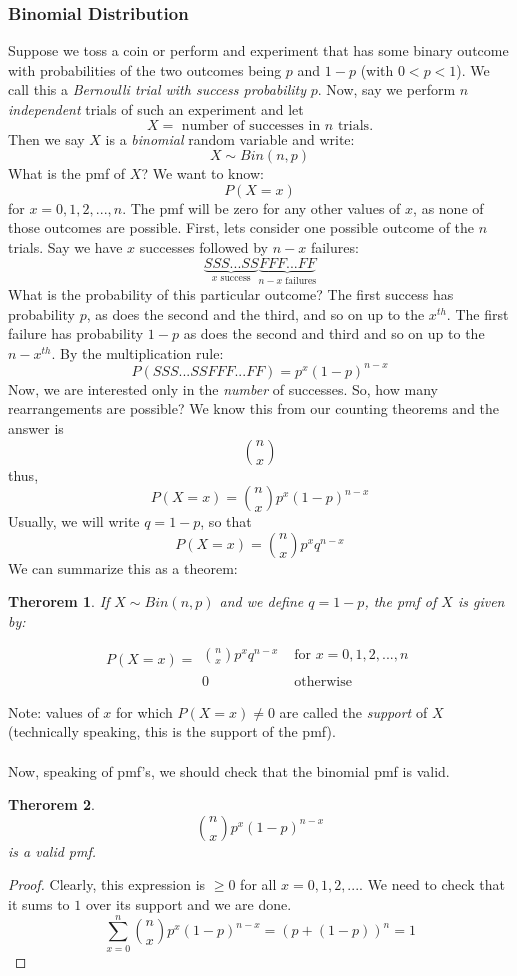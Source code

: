 \documentclass[12pt]{article} %
\newtheorem{thm}{Therorem}
\begin{document}
\subsubsection{Binomial Distribution}
Suppose we toss a coin or perform and experiment that has some binary outcome with probabilities of the two outcomes being $p$ and $1-p$ (with $0<p<1$). We call this a \emph{Bernoulli trial with success probability} $p$. Now, say we perform $n$ \emph{independent} trials of such an experiment and let 
$$X = \textrm{ number of successes in } n \textrm{ trials.}$$
Then we say $X$ is a \emph{binomial} random variable and write:
$$X\sim Bin(n,p)$$
What is the pmf of $X$? We want to know:
$$P(X = x)$$
for $x=0,1,2,...,n$. The pmf will be zero for any other values of $x$, as none of those outcomes are possible. First, lets consider one possible outcome of the $n$ trials. Say we have $x$ successes followed by $n-x$ failures:
$$\underbrace{SSS...SS}_{x\textrm{ success}}\underbrace{FFF...FF}_{n-x\textrm{ failures}}$$
What is the probability of this particular outcome? The first success has probability $p$, as does the second and the third, and so on up to the $x^{th}$. The first failure has probability $1-p$ as does the second and third and so on up to the $n-x^{th}$. By the multiplication rule:
$$P(SSS...SSFFF...FF) = p^x(1-p)^{n-x}$$
Now, we are interested only in the \emph{number} of successes. So, how many rearrangements are possible? We know this from our counting theorems and the answer is 
$$n\choose{x}$$
thus, 
$$P(X = x) = {n\choose{x}} p^x(1-p)^{n-x}$$
Usually, we will write $q=1-p$, so that 
$$P(X = x) = {n\choose{x}} p^xq^{n-x}$$
We can summarize this as a theorem:
\begin{thm}
If $X\sim Bin(n,p)$ and we define $q=1-p$, the pmf of $X$ is given by:
$$P(X = x) = \begin{matrix}&\\&\\{n\choose{x}} p^xq^{n-x}&\textrm{ for } x=0,1,2,...,n\\&\\0&\textrm{ otherwise}\end{matrix}$$
\end{thm}
Note: values of $x$ for which $P(X=x)\neq 0$ are called the \emph{support} of $X$ (technically speaking, this is the support of the pmf).\\\\
Now, speaking of pmf's, we should check that the binomial pmf is valid.
\begin{thm}
$${n\choose{x}} p^x(1-p)^{n-x}$$
is a valid pmf.
\end{thm}
\begin{proof}
Clearly, this expression is $\geq 0$ for all $x = 0,1,2,...$. We need to check that it sums to $1$ over its support and we are done.
$$\sum_{x=0}^n {n\choose{x}}p^x(1-p)^{n-x}= (p+(1-p))^n = 1$$
\end{proof}
\end{document}
